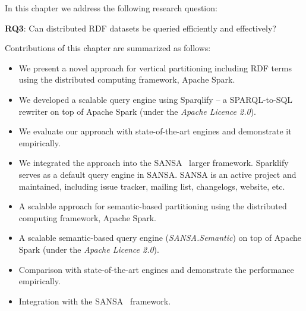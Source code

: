 In this chapter we address the following research question:
\begin{tcolorbox}
\textbf{RQ3}: Can distributed RDF datasets be queried efficiently and effectively?
\end{tcolorbox}

Contributions of this chapter are summarized as follows:

\begin{itemize}
 \item We present a novel approach for vertical partitioning including RDF terms using the distributed computing framework, Apache Spark.
 \item We developed a scalable query engine using Sparqlify -- a SPARQL-to-SQL rewriter on top of Apache Spark (under the \textit{Apache Licence 2.0}).
 \item We evaluate our approach with state-of-the-art engines and demonstrate it empirically.
 \item We integrated the approach into the SANSA~\cite{lehmann-2017-sansa-iswc} larger framework.
 Sparklify serves as a default query engine in SANSA.
 SANSA is an active project and maintained, including issue tracker, mailing list, changelogs, website, etc.
 \item A scalable approach for semantic-based partitioning using the distributed computing framework, Apache Spark.
 \item A scalable semantic-based query engine (\textit{SANSA.Semantic}) on top of Apache Spark (under the \textit{Apache Licence 2.0}).
 \item Comparison with state-of-the-art engines and demonstrate the performance empirically.
 \item Integration with the SANSA~\cite{lehmann-2017-sansa-iswc} framework.
\end{itemize}



